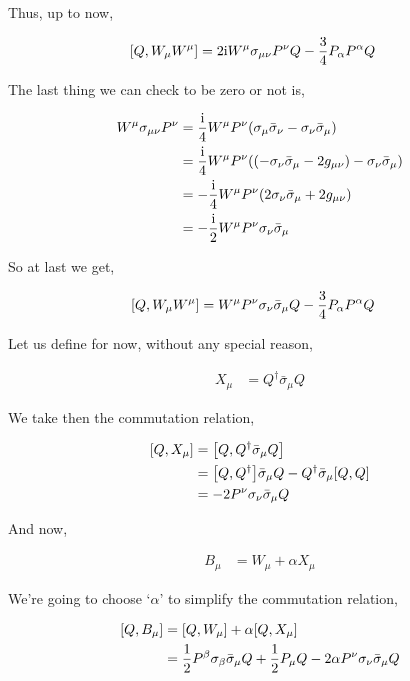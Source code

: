 Thus, up to now,

\begin{align}
    \comm{Q}{W_\mu W^\mu}&=2\im W^\mu\sigma_{\mu\nu}P^\nu Q-\frac34P_\alpha P^\alpha Q\nonumber
\end{align}

The last thing we can check to be zero or not is,

\begin{align}
    W^\mu\sigma_{\mu\nu}P^\nu&=\frac{\textnormal{i}} 4W^\mu P^\nu\qty(\sigma_\mu{\bar\sigma}_\nu-\sigma_\nu{\bar\sigma}_\mu)\nonumber\\
    &=\frac{\textnormal{i}} 4W^\mu P^\nu\qty(\qty(-\sigma_\nu{\bar\sigma}_\mu-2g_{\mu\nu})-\sigma_\nu{\bar\sigma}_\mu)\nonumber\\
    &=-\frac{\textnormal{i}} 4W^\mu P^\nu\qty(2\sigma_\nu{\bar\sigma}_\mu+2g_{\mu\nu})\nonumber\\
    &=-\frac{\textnormal{i}} 2W^\mu P^\nu\sigma_\nu{\bar\sigma}_\mu\nonumber
\end{align} 

So at last we get,

\begin{align}
    \comm{Q}{W_\mu W^\mu}&=W^\mu P^\nu\sigma_\nu{\bar\sigma}_\mu  Q-\frac34P_\alpha P^\alpha Q\nonumber
\end{align}

Let us define for now, without any special reason,

\begin{align}
    X_\mu &= Q^\dagger{\bar\sigma}_\mu Q\nonumber
\end{align}

We take then the commutation relation,

\begin{align}
    \comm{Q}{X_\mu}&=\comm{Q}{Q^\dagger{\bar\sigma}_\mu Q}\nonumber\\
    &=\comm{Q}{Q^\dagger}{\bar\sigma}_\mu Q-Q^\dagger{\bar\sigma}_\mu\comm{Q}{Q}\nonumber\\
    &=-2P^\nu\sigma_\nu{\bar\sigma}_\mu Q\nonumber
\end{align}

And now,

\begin{align}
    B_\mu&=W_\mu+\alpha X_\mu\nonumber
\end{align}

We're going to choose `$\alpha$' to simplify the commutation relation,

\begin{align}
    \comm{Q}{B_\mu}&=\comm{Q}{W_\mu}+\alpha\comm{Q}{X_\mu}\nonumber\\
    &=\frac12P^\beta\sigma_\beta{\bar\sigma}_\mu Q+\frac12 P_\mu Q-2\alpha P^\nu\sigma_\nu{\bar\sigma}_\mu Q\nonumber
\end{align}

